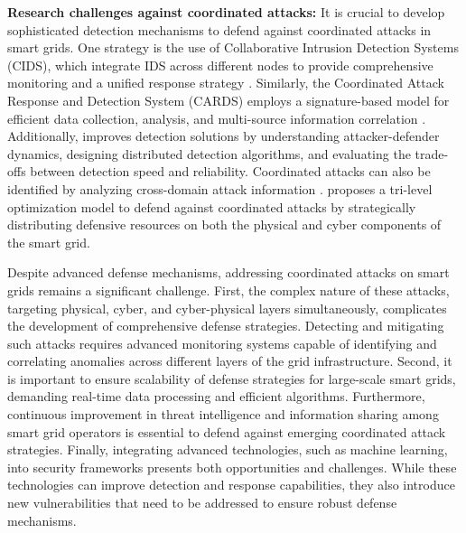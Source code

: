 \documentclass[10pt, journal]{IEEEtran}
\begin{document}




\textbf{Research challenges against coordinated attacks:}
It is crucial to develop sophisticated detection mechanisms to defend against coordinated attacks in smart grids. One strategy is the use of Collaborative Intrusion Detection Systems (CIDS), which integrate IDS across different nodes to provide comprehensive monitoring and a unified response strategy \cite{zhou2010survey}. Similarly, the Coordinated Attack Response and Detection System (CARDS) employs a signature-based model for efficient data collection, analysis, and multi-source information correlation \cite{yang2000cards}. Additionally, \cite{cui2012coordinated} improves detection solutions by understanding attacker-defender dynamics, designing distributed detection algorithms, and evaluating the trade-offs between detection speed and reliability. Coordinated attacks can also be identified by analyzing cross-domain attack information \cite{sen2021towards}. \cite{lai2019tri} proposes a tri-level optimization model to defend against coordinated attacks by strategically distributing defensive resources on both the physical and cyber components of the smart grid.

Despite advanced defense mechanisms, addressing coordinated attacks on smart grids remains a significant challenge. First, the complex nature of these attacks, targeting physical, cyber, and cyber-physical layers simultaneously, complicates the development of comprehensive defense strategies. Detecting and mitigating such attacks requires advanced monitoring systems capable of identifying and correlating anomalies across different layers of the grid infrastructure. Second, it is important to ensure scalability of defense strategies for large-scale smart grids, demanding real-time data processing and efficient algorithms. Furthermore, continuous improvement in threat intelligence and information sharing among smart grid operators is essential to defend against emerging coordinated attack strategies. Finally, integrating advanced technologies, such as machine learning, into security frameworks presents both opportunities and challenges. While these technologies can improve detection and response capabilities, they also introduce new vulnerabilities that need to be addressed to ensure robust defense mechanisms.
\end{document}
